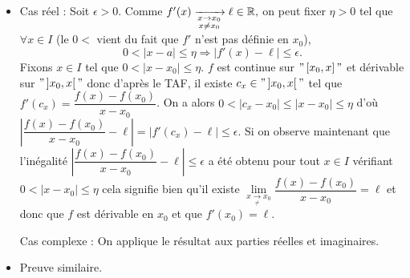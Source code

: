 \documentclass{magnolia}
\begin{document}
\begin{preuve}
  \begin{itemize}
  \item Cas réel : Soit $\epsilon>0$. Comme $f'(x)\xrightarrow[ \substack{x\rightarrow x_0 \\ x\not=x_0}]{} \ell\in\mathbb{R},$ on peut fixer $\eta>0$ tel que $\forall x \in I$ (le $0<$ vient du fait que $f'$ n'est pas définie en $x_0$), $$0<|x-a|\leq \eta \Longrightarrow |f'(x)-\ell|\leq \epsilon.$$
  Fixons $x\in I$ tel que $0<|x-x_0|\leq \eta$. $f$ est continue sur $"\left[x_0,x\right]"$ et dérivable sur $"\left]x_0,x\right["$ donc d'après le TAF, il existe $c_x\in "\left]x_0,x\right["$ tel que $f'(c_x)=\dfrac{f(x)-f(x_0)}{x-x_0}$. On a alors $0<|c_x-x_0|\leq |x-x_0|\leq\eta$ d'où $|\dfrac{f(x)-f(x_0)}{x-x_0}-\ell|=|f'(c_x)-\ell|\leq \epsilon$. Si on observe maintenant que l'inégalité $|\dfrac{f(x)-f(x_0)}{x-x_0}-\ell|\leq \epsilon$ a été obtenu pour tout $x\in I$ vérifiant $0<|x-x_0|\leq \eta$ cela signifie bien qu'il existe $\underset{x\underset{\neq}{\to}x_0}{\lim}\dfrac{f(x)-f(x_0)}{x-x_0}=\ell$ et donc que $f$ est dérivable en $x_0$ et que $f'(x_0)=\ell$.
  
  Cas complexe : On applique le résultat aux parties réelles et imaginaires.
    
  \item Preuve similaire.
  \end{itemize}
  
  \end{preuve}
\end{document}
